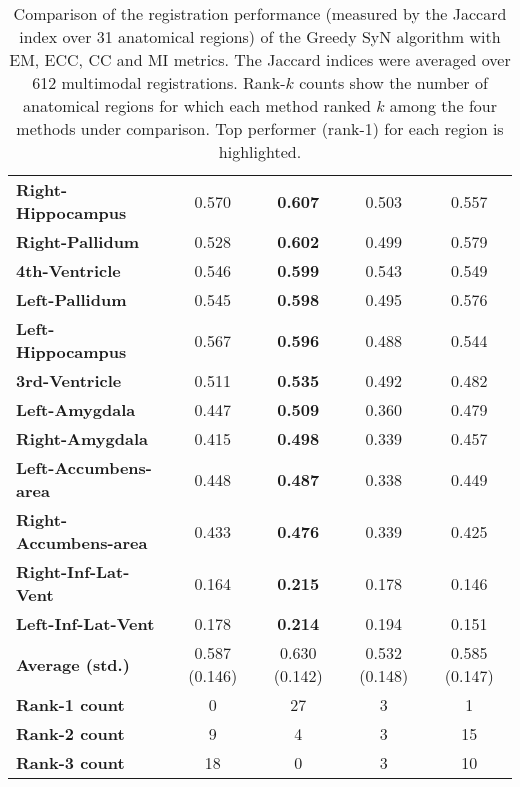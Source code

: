 \begin{table}[htbp]
{\begin{tabular}{lcccc}
    \textbf{Right-Hippocampus} & 0.570 & \textbf{0.607} & 0.503 & 0.557 \\
    \textbf{Right-Pallidum} & 0.528 & \textbf{0.602} & 0.499 & 0.579 \\
    \textbf{4th-Ventricle} & 0.546 & \textbf{0.599} & 0.543 & 0.549 \\
    \textbf{Left-Pallidum} & 0.545 & \textbf{0.598} & 0.495 & 0.576 \\
    \textbf{Left-Hippocampus} & 0.567 & \textbf{0.596} & 0.488 & 0.544 \\
    \textbf{3rd-Ventricle} & 0.511 & \textbf{0.535} & 0.492 & 0.482 \\
    \textbf{Left-Amygdala} & 0.447 & \textbf{0.509} & 0.360 & 0.479 \\
    \textbf{Right-Amygdala} & 0.415 & \textbf{0.498} & 0.339 & 0.457 \\
    \textbf{Left-Accumbens-area} & 0.448 & \textbf{0.487} & 0.338 & 0.449 \\
    \textbf{Right-Accumbens-area} & 0.433 & \textbf{0.476} & 0.339 & 0.425 \\
    \textbf{Right-Inf-Lat-Vent} & 0.164 & \textbf{0.215} & 0.178 & 0.146 \\
    \textbf{Left-Inf-Lat-Vent} & 0.178 & \textbf{0.214} & 0.194 & 0.151 \\
    \hline
    \textbf{Average (std.)} & 0.587 (0.146) & 0.630 (0.142) & 0.532 (0.148) & 0.585 (0.147) \\
    \textbf{Rank-1 count} & 0 & 27 & 3 & 1 \\
    \textbf{Rank-2 count} & 9 & 4 & 3 & 15 \\
    \textbf{Rank-3 count} & 18 & 0 & 3 & 10 \\
    \bottomrule
    \end{tabular}}%
    \caption{Comparison of the registration performance (measured by the Jaccard index over 31 anatomical regions) of the Greedy SyN algorithm with EM, ECC, CC and MI metrics.
The Jaccard indices were averaged over 612 multimodal registrations. Rank-$k$ counts show the number of anatomical regions for which each
method ranked $k$ among the four methods under comparison. Top performer (rank-1) for each region is highlighted.}
  \label{tab:multimodal_results_seg}%
\end{table}%
